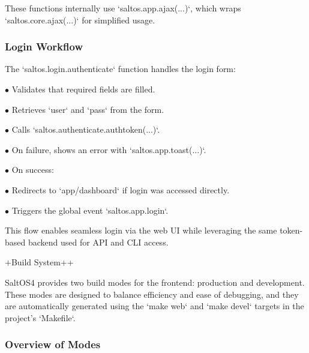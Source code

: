\documentclass[a4paper]{article}
\begin{document}
These functions internally use `saltos.app.ajax(...)`, which wraps `saltos.core.ajax(...)` for simplified usage.

\hypertarget{toc43}{}
\subsubsection{Login Workflow}

The `saltos.login.authenticate` function handles the login form:

\begin{compactitem}
\item[\color{myblue}$\bullet$] Validates that required fields are filled.
\item[\color{myblue}$\bullet$] Retrieves `user` and `pass` from the form.
\item[\color{myblue}$\bullet$] Calls `saltos.authenticate.authtoken(...)`.
\item[\color{myblue}$\bullet$] On failure, shows an error with `saltos.app.toast(...)`.
\item[\color{myblue}$\bullet$] On success:
\item[\color{myblue}$\bullet$] Redirects to `app/dashboard` if login was accessed directly.
\item[\color{myblue}$\bullet$] Triggers the global event `saltos.app.login`.
\end{compactitem}

This flow enables seamless login via the web UI while leveraging the same token-based backend used for API and CLI access.

+Build System++

SaltOS4 provides two build modes for the frontend: production and development. These modes are designed to balance efficiency and ease of debugging, and they are automatically generated using the `make web` and `make devel` targets in the project’s `Makefile`.

\hypertarget{toc44}{}
\subsubsection{Overview of Modes}
\end{document}
